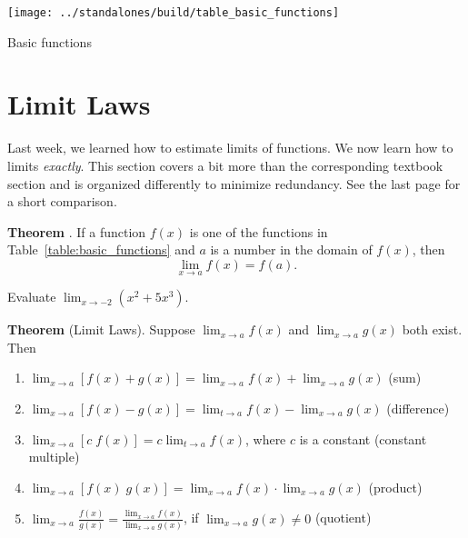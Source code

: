 \documentclass[../main.tex]{subfiles}
\begin{document}
\clearpage

\begin{table}[h]  %
  \centering
  \texttt{[image: ../standalones/build/table\_basic\_functions]}
  \caption{Basic functions}
  \label{table:basic_functions}
\end{table}

\section{Limit Laws}

Last week, we learned how to estimate limits of functions. We now learn how to  limits \emph{exactly}.
\faExclamationTriangle{} This section covers a bit more than the corresponding textbook section and is organized differently to minimize redundancy. See the last page for a short comparison.

\begin{mdframed}[style=simple]
  \textbf{Theorem \faStar{}}. If a function \(f(x)\) is one of the functions in Table~\ref{table:basic_functions} and \(a\) is a number in the {domain} of \(f(x)\), then
  \[
    \lim_{x \to a} f(x) = {f(a).}
  \]
\end{mdframed}

\begin{example}
  Evaluate \(\lim_{x \to -2} (x^{2} + 5 x^{3})\).

\end{example}
\clearpage


\begin{mdframed}[style=withref]
  \textbf{Theorem} (Limit Laws). Suppose \(\lim_{x \to a} f(x)\) and \(\lim_{x \to a} g(x)\) {both exist}. Then
  \begin{enumerate}[label=(\arabic*)]
    \item \(\lim_{x \to a} [f(x) + g(x)] = \lim_{x \to a} f(x) + \lim_{x \to a} g(x)\) \hfill (sum)
    \item \(\lim_{x \to a} [f(x) - g(x)] = \lim_{t \to a} f(x) - \lim_{x \to a} g(x)\) \hfill (difference)
    \item \(\lim_{x \to a} [c \; f(x)] = c \lim_{t \to a} f(x)\), where \(c\) is a constant \hfill (constant multiple)
    \item \(\lim_{x \to a} [f(x) \; g(x)] = \lim_{x \to a} f(x) \cdot \lim_{x \to a} g(x)\) \hfill (product)
    \item \(\lim_{x \to a} \frac{f(x)}{g(x)} = \frac{\lim_{x \to a} f(x)}{\lim_{x \to a} g(x)}\), \quad if {\(\lim_{x \to a}g(x) \ne 0\)} \hfill (quotient)
  \end{enumerate}
\end{mdframed}
\end{document}
